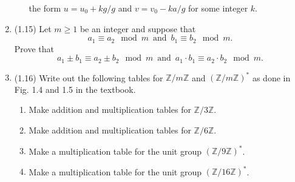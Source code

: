 \documentclass[12pt]{amsart}
\theoremstyle{definition}
\begin{document}
\begin{enumerate}
\begin{enumerate}
				the form $u = u_0 + kg/g$ and $v = v_0 - ka/g$ for some integer $k$. 
		\end{enumerate}
	\item (1.15) Let $m \geq 1$ be an integer and suppose that 
		\begin{displaymath}
			a_1 \equiv a_2 \mod m \ \operatorname{and} \ b_1 \equiv b_2 \mod m.
		\end{displaymath}
		Prove that 
		\begin{displaymath}
			a_1 \pm b_1 \equiv a_2 \pm b_2 \mod m \ \operatorname{and} \ a_1 \cdot b_1 \equiv 
			a_2 \cdot b_2 \mod m. 
		\end{displaymath}
	\item (1.16) Write out the following tables for $\mathbb{Z}/m\mathbb{Z}$ and 
		$(\mathbb{Z}/m\mathbb{Z})^\ast$ as done in Fig. 1.4 and 1.5 in the textbook. 
		\begin{enumerate}
			\item Make addition and multiplication tables for $\mathbb{Z}/3\mathbb{Z}$. 
			\item Make addition and multiplication tables for $\mathbb{Z}/6\mathbb{Z}$.
			\item Make a multiplication table for the unit group $(\mathbb{Z}/9\mathbb{Z})^\ast$. 
			\item Make a multiplication table for the unit group $(\mathbb{Z}/16\mathbb{Z})^\ast$. 
		\end{enumerate}
			
\end{enumerate}
\end{document}
